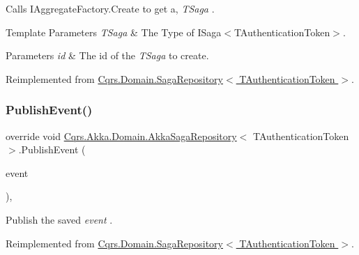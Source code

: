 Calls I\+Aggregate\+Factory.\+Create to get a, {\itshape T\+Saga} . 


\begin{DoxyTemplParams}{Template Parameters}
{\em T\+Saga} & The Type of I\+Saga$<$\+T\+Authentication\+Token$>$.\\
\hline
\end{DoxyTemplParams}

\begin{DoxyParams}{Parameters}
{\em id} & The id of the {\itshape T\+Saga}  to create.\\
\hline
\end{DoxyParams}


Reimplemented from \hyperlink{classCqrs_1_1Domain_1_1SagaRepository_acb23e0bd3e5655547a13b4ad2b06e548_acb23e0bd3e5655547a13b4ad2b06e548}{Cqrs.\+Domain.\+Saga\+Repository$<$ T\+Authentication\+Token $>$}.

\mbox{\label{classCqrs_1_1Akka_1_1Domain_1_1AkkaSagaRepository_a7f6375bb99e680792466fb420232a535_a7f6375bb99e680792466fb420232a535}} 
\subsubsection{\texorpdfstring{Publish\+Event()}{PublishEvent()}}
{\footnotesize\ttfamily override void \hyperlink{classCqrs_1_1Akka_1_1Domain_1_1AkkaSagaRepository}{Cqrs.\+Akka.\+Domain.\+Akka\+Saga\+Repository}$<$ T\+Authentication\+Token $>$.Publish\+Event (\begin{DoxyParamCaption}\item[{\hyperlink{interfaceCqrs_1_1Events_1_1ISagaEvent}{I\+Saga\+Event}$<$ T\+Authentication\+Token $>$ @}]{event }\end{DoxyParamCaption})\hspace{0.3cm}{\ttfamily [protected]}, {\ttfamily [virtual]}}



Publish the saved {\itshape event} . 



Reimplemented from \hyperlink{classCqrs_1_1Domain_1_1SagaRepository_a1dec03959e4d859c6cf2be0507b1bc05_a1dec03959e4d859c6cf2be0507b1bc05}{Cqrs.\+Domain.\+Saga\+Repository$<$ T\+Authentication\+Token $>$}.



